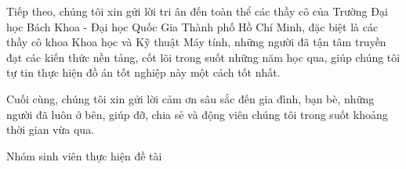 \noindent Tiếp theo, chúng tôi xin gửi lời tri ân đến toàn thể các thầy cô của Trường Đại học Bách Khoa - Đại học Quốc Gia Thành phố Hồ Chí Minh, đặc biệt là các thầy cô khoa Khoa học và Kỹ thuật Máy tính, những người đã tận tâm truyền đạt các kiến thức nền tảng, cốt lõi trong suốt những năm học qua, giúp chúng tôi tự tin thực hiện đồ án tốt nghiệp này một cách tốt nhất.\vspace{0.5cm}

\noindent Cuối cùng, chúng tôi xin gửi lời cảm ơn sâu sắc đến gia đình, bạn bè, những người đã luôn ở bên, giúp đỡ, chia sẻ và động viên chúng tôi trong suốt khoảng thời gian vừa qua.\vspace{0.5cm}

\begin{flushright}
Nhóm sinh viên thực hiện đề tài
\end{flushright}
